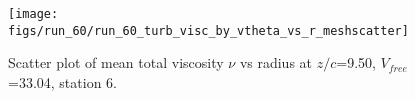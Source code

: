 \begin{figure}[H]
\centering
\texttt{[image: figs/run\_60/run\_60\_turb\_visc\_by\_vtheta\_vs\_r\_meshscatter]}
\caption{Scatter plot of mean total viscosity $\nu$ vs radius at $z/c$=9.50, $V_{free}$=33.04, station 6.}
\label{fig:run_60_turb_visc_by_vtheta_vs_r_meshscatter}
\end{figure}


